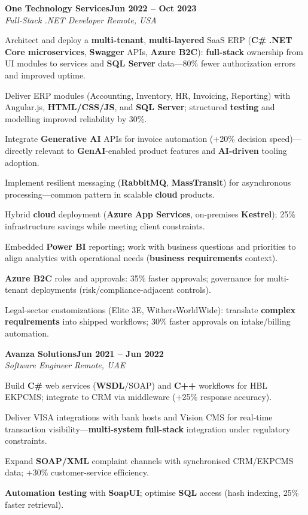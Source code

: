\documentclass[letterpaper,10pt]{article}
\newcommand{\headingBf}[2]{
  \hspace{10pt}\textbf{#1}\hfill\textbf{#2}\\
}
\newcommand{\headingIt}[2]{
  \hspace{10pt}\textit{#1}\hfill\textit{#2}\\
}
\newenvironment{resume_list}{
  \vspace{-7pt}
  \begin{itemize}[itemsep=-2px, parsep=1pt, leftmargin=30pt]
}{
  \end{itemize}
}
\begin{document}
\headingBf{One Technology Services}{Jun 2022 -- Oct 2023}
\headingIt{Full-Stack .NET Developer \hfill Remote, USA}{}
\begin{resume_list}
    \item Architect and deploy a \textbf{multi-tenant}, \textbf{multi-layered} SaaS ERP (\textbf{C\#} \textbf{.NET Core microservices}, \textbf{Swagger} APIs, \textbf{Azure B2C}): \textbf{full-stack} ownership from UI modules to services and \textbf{SQL Server} data---80\% fewer authorization errors and improved uptime.
    \item Deliver ERP modules (Accounting, Inventory, HR, Invoicing, Reporting) with Angular.js, \textbf{HTML/CSS/JS}, and \textbf{SQL Server}; structured \textbf{testing} and modelling improved reliability by 30\%.
    \item Integrate \textbf{Generative AI} APIs for invoice automation (+20\% decision speed)---directly relevant to \textbf{GenAI}-enabled product features and \textbf{AI-driven} tooling adoption.
    \item Implement resilient messaging (\textbf{RabbitMQ}, \textbf{MassTransit}) for asynchronous processing---common pattern in scalable \textbf{cloud} products.
    \item Hybrid \textbf{cloud} deployment (\textbf{Azure App Services}, on-premises \textbf{Kestrel}); 25\% infrastructure savings while meeting client constraints.
    \item Embedded \textbf{Power BI} reporting; work with business questions and priorities to align analytics with operational needs (\textbf{business requirements} context).
    \item \textbf{Azure B2C} roles and approvals: 35\% faster approvals; governance for multi-tenant deployments (risk/compliance-adjacent controls).
    \item Legal-sector customizations (Elite 3E, WithersWorldWide): translate \textbf{complex requirements} into shipped workflows; 30\% faster approvals on intake/billing automation.
\end{resume_list}

\headingBf{Avanza Solutions}{Jun 2021 -- Jun 2022}
\headingIt{Software Engineer \hfill Remote, UAE}{}
\begin{resume_list}
    \item Build \textbf{C\#} web services (\textbf{WSDL}/SOAP) and \textbf{C++} workflows for HBL EKPCMS; integrate to CRM via middleware (+25\% response accuracy).
    \item Deliver VISA integrations with bank hosts and Vision CMS for real-time transaction visibility---\textbf{multi-system} \textbf{full-stack} integration under regulatory constraints.
    \item Expand \textbf{SOAP/XML} complaint channels with synchronised CRM/EKPCMS data; +30\% customer-service efficiency.
    \item \textbf{Automation testing} with \textbf{SoapUI}; optimise \textbf{SQL} access (hash indexing, 25\% faster retrieval).
\end{resume_list}
\end{document}
